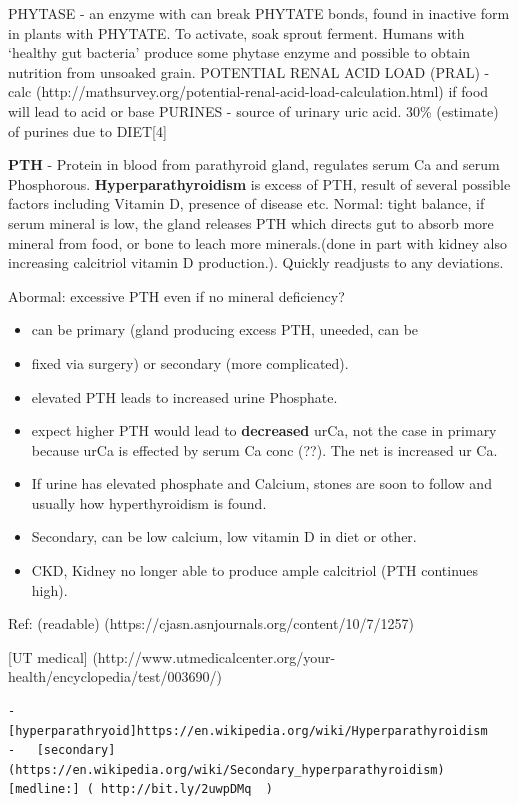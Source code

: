 PHYTASE - an enzyme with can break PHYTATE bonds, found in inactive form
in plants with PHYTATE. To activate, soak\textbar{} sprout \textbar{}
ferment. Humans with `healthy gut bacteria' produce some phytase enzyme
and possible to obtain nutrition from unsoaked grain. POTENTIAL RENAL
ACID LOAD (PRAL) - calc
(http://mathsurvey.org/potential-renal-acid-load-calculation.html) if
food will lead to acid or base PURINES - source of urinary uric acid.
30\% (estimate) of purines due to DIET{[}4{]}

\textbf{PTH} - Protein in blood from parathyroid gland, regulates serum
Ca and serum Phosphorous. \textbf{Hyperparathyroidism} is excess of PTH,
result of several possible factors including Vitamin D, presence of
disease etc. Normal: tight balance, if serum mineral is low, the gland
releases PTH which directs gut to absorb more mineral from food, or bone
to leach more minerals.(done in part with kidney also increasing
calcitriol vitamin D production.). Quickly readjusts to any deviations.

Abormal: excessive PTH even if no mineral deficiency?

\begin{itemize}
\tightlist
\item
  can be primary (gland producing excess PTH, uneeded, can be
\item
  fixed via surgery) or secondary (more complicated).
\item
  elevated PTH leads to increased urine Phosphate.
\item
  expect higher PTH would lead to \textbf{decreased} urCa, not the case
  in primary because urCa is effected by serum Ca conc (??). The net is
  increased ur Ca.
\item
  If urine has elevated phosphate and Calcium, stones are soon to follow
  and usually how hyperthyroidism is found.
\item
  Secondary, can be low calcium, low vitamin D in diet or other.
\item
  CKD, Kidney no longer able to produce ample calcitriol (PTH continues
  high).
\end{itemize}

Ref: (readable) (https://cjasn.asnjournals.org/content/10/7/1257)

{[}UT medical{]}
(http://www.utmedicalcenter.org/your-health/encyclopedia/test/003690/)

\begin{verbatim}
-   [hyperparathryoid]https://en.wikipedia.org/wiki/Hyperparathyroidism
-   [secondary](https://en.wikipedia.org/wiki/Secondary_hyperparathyroidism)
[medline:] ( http://bit.ly/2uwpDMq  )
\end{verbatim}

